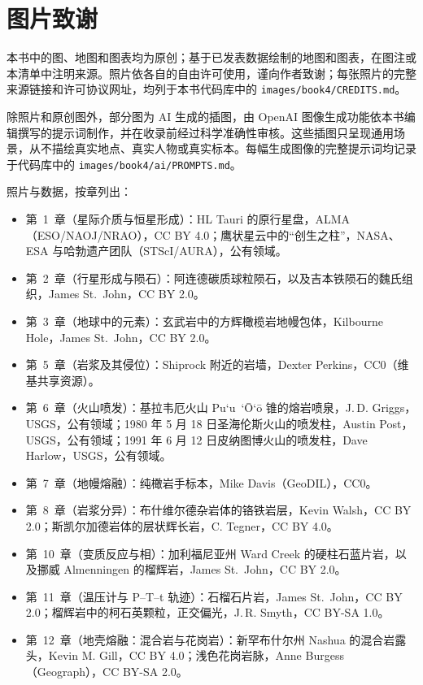 \chapter*{图片致谢}

本书中的图、地图和图表均为原创；基于已发表数据绘制的地图和图表，在图注或本清单中注明来源。照片依各自的自由许可使用，谨向作者致谢；每张照片的完整来源链接和许可协议网址，均列于本书代码库中的 \texttt{images/book4/CREDITS.md}。

\bigskip
除照片和原创图外，部分图为 AI 生成的插图，由 OpenAI 图像生成功能依本书编辑撰写的提示词制作，并在收录前经过科学准确性审核。这些插图只呈现通用场景，从不描绘真实地点、真实人物或真实标本。每幅生成图像的完整提示词均记录于代码库中的 \texttt{images/book4/ai/PROMPTS.md}。

\bigskip
\noindent 照片与数据，按章列出：
\begin{itemize}\small
  \item 第~1~章（星际介质与恒星形成）：HL Tauri 的原行星盘，ALMA（ESO/NAOJ/NRAO），CC BY 4.0；鹰状星云中的“创生之柱”，NASA、ESA 与哈勃遗产团队（STScI/AURA），公有领域。
  \item 第~2~章（行星形成与陨石）：阿连德碳质球粒陨石，以及吉本铁陨石的魏氏组织，James St.~John，CC BY 2.0。
  \item 第~3~章（地球中的元素）：玄武岩中的方辉橄榄岩地幔包体，Kilbourne Hole，James St.~John，CC BY 2.0。
  \item 第~5~章（岩浆及其侵位）：Shiprock 附近的岩墙，Dexter Perkins，CC0（维基共享资源）。
  \item 第~6~章（火山喷发）：基拉韦厄火山 Pu`u~`\=O`\=o 锥的熔岩喷泉，J.\,D. Griggs，USGS，公有领域；1980 年 5 月 18 日圣海伦斯火山的喷发柱，Austin Post，USGS，公有领域；1991 年 6 月 12 日皮纳图博火山的喷发柱，Dave Harlow，USGS，公有领域。
  \item 第~7~章（地幔熔融）：纯橄岩手标本，Mike Davis（GeoDIL），CC0。
  \item 第~8~章（岩浆分异）：布什维尔德杂岩体的铬铁岩层，Kevin Walsh，CC BY 2.0；斯凯尔加德岩体的层状辉长岩，C. Tegner，CC BY 4.0。
  \item 第~10~章（变质反应与相）：加利福尼亚州 Ward Creek 的硬柱石蓝片岩，以及挪威 Almenningen 的榴辉岩，James St.~John，CC BY 2.0。
  \item 第~11~章（温压计与 P--T--t 轨迹）：石榴石片岩，James St.~John，CC BY 2.0；榴辉岩中的柯石英颗粒，正交偏光，J.\,R. Smyth，CC BY-SA 1.0。
  \item 第~12~章（地壳熔融：混合岩与花岗岩）：新罕布什尔州 Nashua 的混合岩露头，Kevin M. Gill，CC BY 4.0；浅色花岗岩脉，Anne Burgess（Geograph），CC BY-SA 2.0。

\end{itemize}
